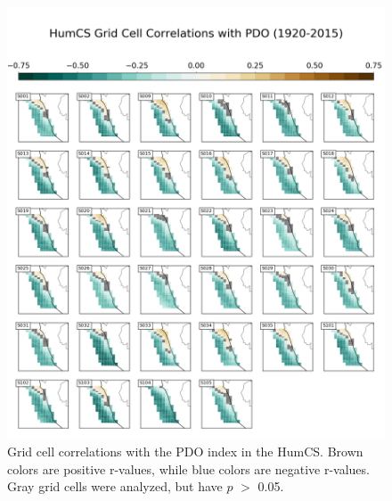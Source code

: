 \documentclass[12pt]{article}
\begin{document}
\begin{figure}[!h]
	\centering
	\includegraphics[width=\linewidth]{../../figs/humcs/spatial-correlations/humcs-grid-cell-correlations-pdo-postage.png}
	\caption{Grid cell correlations with the PDO index in the HumCS. Brown colors are positive r-values, while blue colors are negative r-values. Gray grid cells were analyzed, but have $p$ $>$ 0.05.}
	\label{fig:HumCS-PDO-Spatial}
\end{figure}



\clearpage

\end{document}
